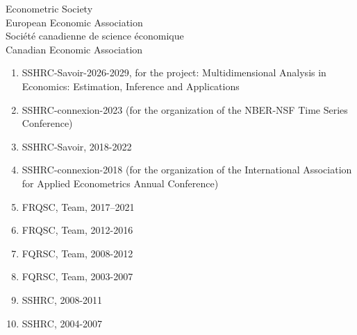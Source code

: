

\vspace{.5cm}


 \vspace{.3cm}

\noindent Econometric Society\\
European Economic Association\\
Soci\'et\'e canadienne de science \'economique\\
Canadian Economic Association

\vspace{.5cm}

 \vspace{.3cm}

\begin{enumerate}
\item SSHRC-Savoir-2026-2029, for the project: Multidimensional Analysis in Economics: Estimation, Inference and Applications
\item SSHRC-connexion-2023 (for the organization of the NBER-NSF Time Series Conference)
\item SSHRC-Savoir, 2018-2022
\item SSHRC-connexion-2018 (for the organization of the International Association for Applied Econometrics Annual Conference)
\item FRQSC, Team, 2017--2021
\item FRQSC, Team, 2012-2016
\item FQRSC, Team, 2008-2012
\item FQRSC, Team, 2003-2007
\item SSHRC, 2008-2011
\item SSHRC, 2004-2007
\end{enumerate}

\vfill\eject

